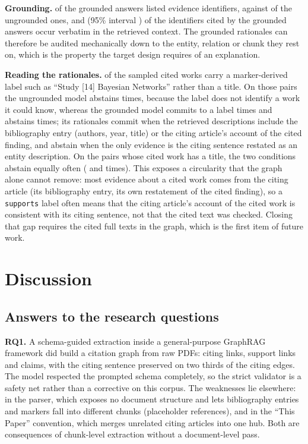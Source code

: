 \documentclass[lettersize,journal]{IEEEtran}
\begin{document}
\textbf{Grounding.} \pilotAEvidencePct{} of the grounded answers listed evidence identifiers, against \pilotBEvidencePct{} of the ungrounded ones, and \pilotIdsGroundedPct{} (95\% interval \pilotIdsGroundedCI) of the \pilotIdsTotal{} identifiers cited by the grounded answers occur verbatim in the retrieved context. The grounded rationales can therefore be audited mechanically down to the entity, relation or chunk they rest on, which is the property the target design requires of an explanation.

\textbf{Reading the rationales.} \pilotMarkerPairs{} of the \pilotN{} sampled cited works carry a marker-derived label such as ``Study [14] Bayesian Networks'' rather than a title. On those pairs the ungrounded model abstains \pilotMarkerBAbstain{} times, because the label does not identify a work it could know, whereas the grounded model commits to a label \pilotMarkerACommit{} times and abstains \pilotMarkerAAbstain{} times; its rationales commit when the retrieved descriptions include the bibliography entry (authors, year, title) or the citing article's account of the cited finding, and abstain when the only evidence is the citing sentence restated as an entity description. On the \pilotTitledPairs{} pairs whose cited work has a title, the two conditions abstain equally often (\pilotTitledAAbstain{} and \pilotTitledBAbstain{} times). This exposes a circularity that the graph alone cannot remove: most evidence about a cited work comes from the citing article (its bibliography entry, its own restatement of the cited finding), so a \texttt{supports} label often means that the citing article's account of the cited work is consistent with its citing sentence, not that the cited text was checked. Closing that gap requires the cited full texts in the graph, which is the first item of future work.



\section{Discussion}
\label{sec:discussion}

\subsection{Answers to the research questions}

\textbf{RQ1.} A schema-guided extraction inside a general-purpose GraphRAG framework did build a citation graph from raw PDFs: \nCites{} citing links, \nSupports{} support links and \nClaims{} claims, with the citing sentence preserved on two thirds of the citing edges. The model respected the prompted schema completely, so the strict validator is a safety net rather than a corrective on this corpus. The weaknesses lie elsewhere: in the parser, which exposes no document structure and lets bibliography entries and markers fall into different chunks (placeholder references), and in the ``This Paper'' convention, which merges unrelated citing articles into one hub. Both are consequences of chunk-level extraction without a document-level pass.
\end{document}
